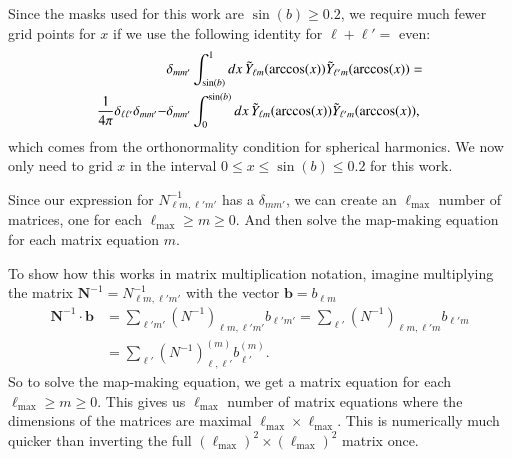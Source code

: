 \documentclass[twocolumn]{../common/aa}
\begin{document}
Since the masks used for this work are $\sin(b)\geq 0.2$, we require much fewer grid points for $x$ if we use the following identity for $\ell+\ell' = $ even:
\begin{align}
&\delta_{mm'} \int_{\sin(b)}^{1} dx \, \Tilde{Y}_{\ell m}(\arccos(x)) \Tilde{Y}_{\ell' m}(\arccos(x)) = \\
\frac{1}{4\pi}\delta_{\ell \ell'}\delta_{m m'} - &\delta_{mm'} \int_{0}^{\sin(b)} dx \, \Tilde{Y}_{\ell m}(\arccos(x)) \Tilde{Y}_{\ell' m}(\arccos(x)),
\end{align}
which comes from the orthonormality condition for spherical harmonics. We now only need to grid $x$ in the interval $0\leq x \leq \sin(b) \leq 0.2$ for this work.

Since our expression for $N^{-1}_{\ell m, \ell' m'}$ has a $\delta_{m m'}$, we can create an $\ell_{\textrm{max}}$ number of matrices, one for each $\ell_{\mathrm{max}}\geq m \geq 0$. And then solve the map-making equation for each matrix equation $m$.

To show how this works in matrix multiplication notation, imagine multiplying the matrix $\textbf{N}^{-1} = N^{-1}_{\ell m, \ell' m'}$ with the vector $\textbf{b} = b_{\ell m}$
\begin{align}
\textbf{N}^{-1} \cdot \textbf{b} &= \sum_{\ell' m'}\left(N^{-1}\right)_{\ell m, \ell' m'}b_{\ell' m'} = \sum_{\ell'}\left(N^{-1}\right)_{\ell m, \ell' m}b_{\ell' m}\\
&= \sum_{\ell' }\left(N^{-1}\right)^{(m)}_{\ell, \ell'}b^{(m)}_{\ell'}.
\end{align}
So to solve the map-making equation, we get a matrix equation for each $\ell_{\mathrm{max}}\geq m \geq 0$. This gives us $\ell_{\textrm{max}}$ number of matrix equations where the dimensions of the matrices are maximal $\ell_{\textrm{max}} \times \ell_{\textrm{max}}$. This is numerically much quicker than inverting the full $(\ell_{\textrm{max}})^2 \times (\ell_{\textrm{max}})^2$ matrix once.
\end{document}
